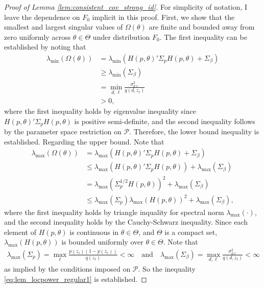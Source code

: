 \documentclass[11pt]{article}
\theoremstyle{definition}
\newcommand{\0}{\ensuremath{\mathbf{0}}}
\begin{document}
\begin{bibunit}
\begin{proof}[Proof of Lemma \ref{lem:consistent_cov_strong_id}]
For simplicity of notation, I leave the dependence on $F_0$ implicit in this proof. 
First, we show that the smallest and largest singular values of $\Omega(\theta)$ are finite and bounded away from zero uniformly across $\theta\in \Theta$ under distribution $F_0$. The first inequality can be established by noting that 
\begin{align*}
    \lambda_{\min}(\Omega(\theta)) 
    &= \lambda_{\min}(H(p,\theta)'\Sigma_{p}H(p,\theta) + \Sigma_{\beta}) \\ 
    &\geq \lambda_{\min}(\Sigma_\beta) \\
    &= \min_{d, \ell} \frac{\sigma_{d\ell}^2}{q(d,z_\ell)} \\
    &> 0,
\end{align*}
where the first inequality holds by eigenvalue inequality since $H(p,\theta)'\Sigma_p H(p,\theta)$ is positive semi-definite, and the second inequality follows by the parameter space restriction on $\mathcal{P}$. Therefore, the lower bound inequality is established. Regarding the upper bound. Note that 
\begin{align*}
    \lambda_{\max}(\Omega(\theta))
    &= \lambda_{\max}(H(p,\theta)'\Sigma_{p}H(p,\theta) + \Sigma_{\beta}) \\
    &\leq \lambda_{\max}(H(p,\theta)'\Sigma_{p}H(p,\theta)) + \lambda_{\max}(\Sigma_{\beta}) \\
    &= \lambda_{\max}(\Sigma_p^{1/2}H(p,\theta))^2 + \lambda_{\max}(\Sigma_{\beta}) \\
    &\leq \lambda_{\max}(\Sigma_p) \lambda_{\max}(H(p,\theta))^2 + \lambda_{\max}(\Sigma_\beta),
\end{align*}
where the first inequality holds by triangle inquality for spectral norm $\lambda_{\max}(\cdot)$, and the second inequality holds by the Cauchy-Schwarz inequality. Since each element of $H(p,\theta)$ is continuous in $\theta \in \Theta$, and $\Theta$ is a compact set, $\lambda_{\max}(H(p,\theta))$ is bounded uniformly over $\theta \in \Theta$. Note that 
\begin{align*}
     \lambda_{\max}(\Sigma_p) = \max_{\ell} \frac{p(z_\ell)(1-p(z_\ell))}{q(z_\ell)} < \infty 
    \quad \text{and} \quad 
     \lambda_{\max}(\Sigma_\beta) = \max_{d, \ell} \frac{\sigma_{d\ell}^2}{q(d,z_\ell)} < \infty
\end{align*}
as implied by the conditions imposed on $\mathcal{P}$. So the inequality \eqref{eq:lem_locpower_regular1} is established.


\end{proof}
\end{bibunit}
\end{document}
